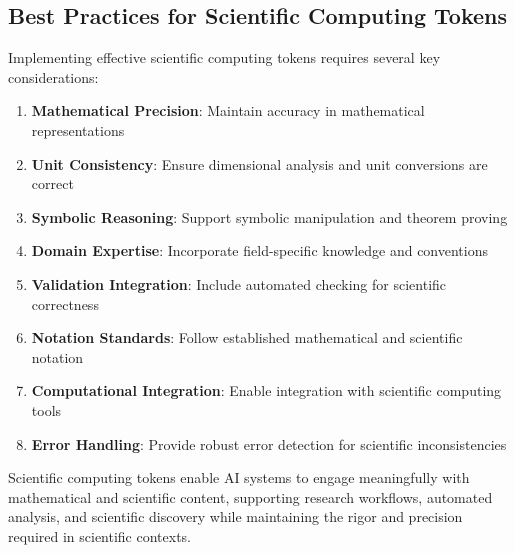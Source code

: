 \subsection{Best Practices for Scientific Computing Tokens}

Implementing effective scientific computing tokens requires several key considerations:

\begin{enumerate}
\item \textbf{Mathematical Precision}: Maintain accuracy in mathematical representations
\item \textbf{Unit Consistency}: Ensure dimensional analysis and unit conversions are correct
\item \textbf{Symbolic Reasoning}: Support symbolic manipulation and theorem proving
\item \textbf{Domain Expertise}: Incorporate field-specific knowledge and conventions
\item \textbf{Validation Integration}: Include automated checking for scientific correctness
\item \textbf{Notation Standards}: Follow established mathematical and scientific notation
\item \textbf{Computational Integration}: Enable integration with scientific computing tools
\item \textbf{Error Handling}: Provide robust error detection for scientific inconsistencies
\end{enumerate}

Scientific computing tokens enable AI systems to engage meaningfully with mathematical and scientific content, supporting research workflows, automated analysis, and scientific discovery while maintaining the rigor and precision required in scientific contexts.
